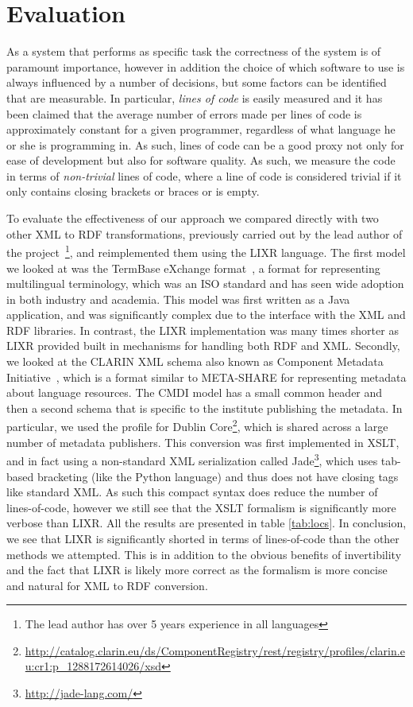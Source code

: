 \documentclass{acm_proc_article-sp}
\begin{document}
\section{Evaluation}
\label{sec:results}


As a system that performs as specific task the correctness of the system is of 
paramount importance, however in addition the choice of which software to use
is always influenced by a number of decisions, but some factors can be identified
that are measurable. In particular, \emph{lines of code} is easily measured and it
has been claimed that the average number of errors made per lines of code is 
approximately constant for a given programmer, regardless of what language he or
she is programming in. As such, lines of code can be a good proxy not only for
ease of development but also for software quality. As such, we measure the
code in terms of \emph{non-trivial} lines of code, where a line of code
is considered trivial if it only contains closing brackets or braces or is empty.

To evaluate the effectiveness of our approach we compared directly with two other
XML to RDF transformations, previously carried out by the lead author of the
project~\footnote{The lead author has over 5 years experience in all languages}, and
reimplemented them using the LIXR language. The first model we looked at was the
TermBase eXchange format~\cite[TBX]{iso30042}, a format for representing multilingual
terminology, which was an ISO standard and has seen wide adoption in both industry
and academia. This model was first written as a Java application, and was significantly
complex due to the interface with the XML and RDF libraries. In contrast, the LIXR 
implementation was many times shorter as LIXR provided built in mechanisms for 
handling both RDF and XML. Secondly, we looked at the CLARIN XML schema also known as
Component Metadata Initiative~\cite{broeder2012cmdi}, which is a format similar
to META-SHARE for representing metadata about language resources. The CMDI model
has a small common header and then a second schema that is specific to the
institute publishing the metadata. In particular, we used the profile for 
Dublin Core\footnote{\url{http://catalog.clarin.eu/ds/ComponentRegistry/rest/registry/profiles/clarin.eu:cr1:p\_1288172614026/xsd}},
which is shared across a large number of metadata publishers. This conversion
was first implemented in XSLT, and in fact using a non-standard XML serialization
called Jade\footnote{\url{http://jade-lang.com/}}, which uses tab-based bracketing 
(like the Python language) and thus does not have closing tags like standard XML.
As such this compact syntax does reduce the number of lines-of-code, however we 
still see that the XSLT formalism is significantly more verbose than LIXR. All
the results are presented in table \ref{tab:locs}. In conclusion, we see that
LIXR is significantly shorted in terms of lines-of-code than the other methods
we attempted. This is in addition to the obvious benefits of invertibility and
the fact that LIXR is likely more correct as the formalism is more concise and 
natural for XML to RDF conversion. 
\end{document}
